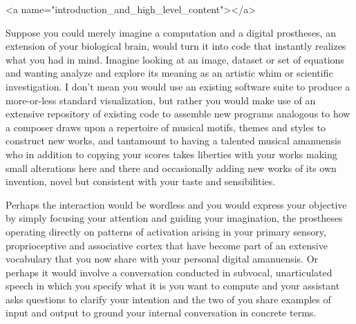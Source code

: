 
\rawhtml
<a name="introduction_and_high_level_content"></a>
\endrawhtml
{}


Suppose you could merely imagine a computation and a digital prostheses, an extension of your biological brain, would turn it into code that instantly realizes what you had in mind. Imagine looking at an image, dataset or set of equations and wanting analyze and explore its meaning as an artistic whim or scientific investigation. I don't mean you would use an existing software suite to produce a more-or-less standard visualization, but rather you would make use of an extensive repository of existing code to assemble new programs analogous to how a composer draws upon a repertoire of musical motifs, themes and styles to construct new works, and tantamount to having a talented musical amanuensis who in addition to copying your scores takes liberties with your works making small alterations here and there and occasionally adding new works of its own invention, novel but consistent with your taste and sensibilities.

Perhaps the interaction would be wordless and you would express your objective by simply focusing your attention and guiding your imagination, the prostheses operating directly on patterns of activation arising in your primary sensory, proprioceptive and associative cortex that have become part of an extensive vocabulary that you now share with your personal digital amanuensis. Or perhaps it would involve a conversation conducted in subvocal, unarticulated speech in which you specify what it is you want to compute and your assistant asks questions to clarify your intention and the two of you share examples of input and output to ground your internal conversation in concrete terms. 

